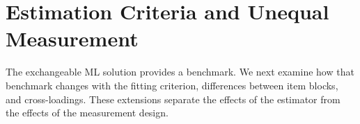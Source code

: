 \section{Estimation Criteria and Unequal Measurement}
\label{sec:extensions}

The exchangeable ML solution provides a benchmark. We next examine how that benchmark changes with the fitting criterion, differences between item blocks, and cross-loadings. These extensions separate the effects of the estimator from the effects of the measurement design.




